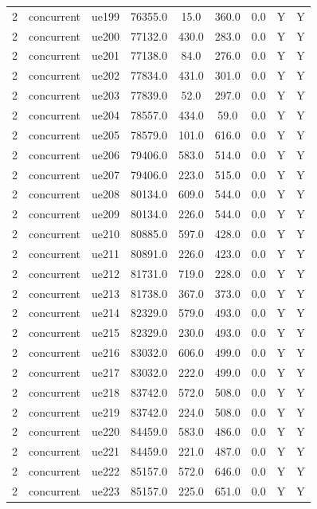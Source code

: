 \begin{table}[ht]
\begin{tabular}{|c|c|c|c|c|c|c|c|c|}
2 & concurrent & ue199 & 76355.0 & 15.0 & 360.0 & 0.0 & Y & Y \\
2 & concurrent & ue200 & 77132.0 & 430.0 & 283.0 & 0.0 & Y & Y \\
2 & concurrent & ue201 & 77138.0 & 84.0 & 276.0 & 0.0 & Y & Y \\
2 & concurrent & ue202 & 77834.0 & 431.0 & 301.0 & 0.0 & Y & Y \\
2 & concurrent & ue203 & 77839.0 & 52.0 & 297.0 & 0.0 & Y & Y \\
2 & concurrent & ue204 & 78557.0 & 434.0 & 59.0 & 0.0 & Y & Y \\
2 & concurrent & ue205 & 78579.0 & 101.0 & 616.0 & 0.0 & Y & Y \\
2 & concurrent & ue206 & 79406.0 & 583.0 & 514.0 & 0.0 & Y & Y \\
2 & concurrent & ue207 & 79406.0 & 223.0 & 515.0 & 0.0 & Y & Y \\
2 & concurrent & ue208 & 80134.0 & 609.0 & 544.0 & 0.0 & Y & Y \\
2 & concurrent & ue209 & 80134.0 & 226.0 & 544.0 & 0.0 & Y & Y \\
2 & concurrent & ue210 & 80885.0 & 597.0 & 428.0 & 0.0 & Y & Y \\
2 & concurrent & ue211 & 80891.0 & 226.0 & 423.0 & 0.0 & Y & Y \\
2 & concurrent & ue212 & 81731.0 & 719.0 & 228.0 & 0.0 & Y & Y \\
2 & concurrent & ue213 & 81738.0 & 367.0 & 373.0 & 0.0 & Y & Y \\
2 & concurrent & ue214 & 82329.0 & 579.0 & 493.0 & 0.0 & Y & Y \\
2 & concurrent & ue215 & 82329.0 & 230.0 & 493.0 & 0.0 & Y & Y \\
2 & concurrent & ue216 & 83032.0 & 606.0 & 499.0 & 0.0 & Y & Y \\
2 & concurrent & ue217 & 83032.0 & 222.0 & 499.0 & 0.0 & Y & Y \\
2 & concurrent & ue218 & 83742.0 & 572.0 & 508.0 & 0.0 & Y & Y \\
2 & concurrent & ue219 & 83742.0 & 224.0 & 508.0 & 0.0 & Y & Y \\
2 & concurrent & ue220 & 84459.0 & 583.0 & 486.0 & 0.0 & Y & Y \\
2 & concurrent & ue221 & 84459.0 & 221.0 & 487.0 & 0.0 & Y & Y \\
2 & concurrent & ue222 & 85157.0 & 572.0 & 646.0 & 0.0 & Y & Y \\
2 & concurrent & ue223 & 85157.0 & 225.0 & 651.0 & 0.0 & Y & Y \\

\end{tabular}
\end{table}
